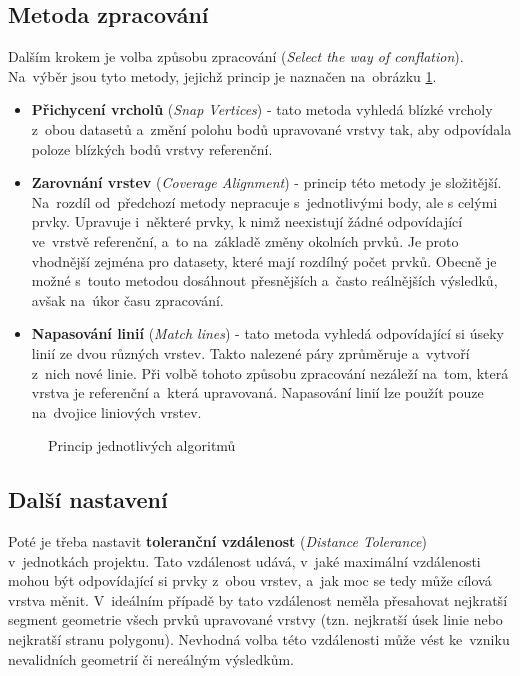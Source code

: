 \subsection{Metoda zpracování}
Dalším krokem je volba způsobu zpracování (\textit{Select the way of conflation}). 
Na~výběr jsou tyto metody, jejichž princip je naznačen na~obrázku \ref{fig:algorithms}.

\begin{itemize}
 \item \textbf{Přichycení vrcholů} (\textit{Snap Vertices}) - tato metoda vyhledá 
	blízké vrcholy z~obou datasetů a~změní polohu bodů upravované vrstvy tak, 
	aby odpovídala poloze blízkých bodů vrstvy referenční.
 \item \textbf{Zarovnání vrstev} (\textit{Coverage Alignment}) - princip této 
	metody je složitější. Na~rozdíl od~předchozí metody nepracuje s~jednotlivými
	body, ale s celými prvky. Upravuje i~ně\-které prvky, k nimž neexistují 
	žádné odpovídající ve~vrstvě refe\-renční, a~to na~základě změny okolních 
	prvků. Je proto vhodnější zejména pro datasety, které mají rozdílný počet
	prvků. Obecně je možné s~touto metodou dosáhnout přesnějších a~často
	reálnějších výsledků, avšak na~úkor času zpraco\-vání.
 \item \textbf{Napasování linií} (\textit{Match lines}) - tato metoda vyhledá
	odpovídající si úseky linií ze dvou různých vrstev. Takto nalezené
	páry zprůměruje a~vytvoří z~nich nové linie. Při volbě tohoto způsobu
	zpracování nezáleží na~tom, která vrstva je referenční a~která upravovaná.
	Napasování linií lze použít pouze na~dvojice liniových vrstev.
\end{itemize}

  \begin{figure}[H]
    \centering
      \def\svgwidth{400pt}
      
      \caption{Princip jednotlivých algoritmů}
      \label{fig:algorithms}
  \end{figure}

\subsection{Další nastavení}
Poté je třeba nastavit \textbf{toleranční vzdálenost} (\textit{Distance 
Tolerance}) v~jednotkách projektu. Tato vzdálenost udává, v~jaké maximální 
vzdálenosti mohou být odpovídající si prvky z~obou vrstev, a~jak moc se 
tedy může cílová vrstva měnit. V~ideálním případě by tato vzdálenost 
neměla přesahovat nejkratší segment geometrie všech prvků upravované vrstvy 
(tzn. nejkratší úsek linie nebo nejkratší stranu polygonu). Nevhodná volba této 
vzdálenosti může vést ke~vzniku nevalidních geometrií či nereálným výsledkům.

